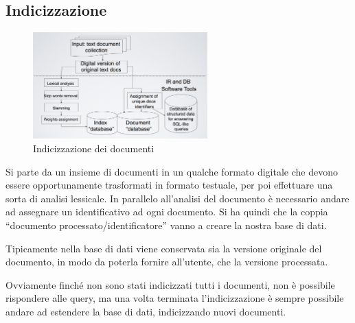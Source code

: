

\subsection{Indicizzazione}

\begin{figure}
	\centering
	\includegraphics[width=0.6\textwidth]{images/l2-indicizzazione.png}
	\caption{Indicizzazione dei documenti}
\end{figure}

Si parte da un insieme di documenti in un qualche formato digitale che devono essere opportunamente trasformati in formato testuale, per poi effettuare una sorta di analisi lessicale.
In parallelo all'analisi del documento è necessario andare ad assegnare un identificativo ad ogni documento. Si ha quindi che la coppia ``documento processato/identificatore'' vanno a creare la nostra base di dati.

Tipicamente nella base di dati viene conservata sia la versione originale del documento, in modo da poterla fornire all'utente, che la versione processata.

Ovviamente finché non sono stati indicizzati tutti i documenti, non è possibile rispondere alle query, ma una volta terminata l'indicizzazione è sempre possibile andare ad estendere la base di dati, indicizzando nuovi documenti.

